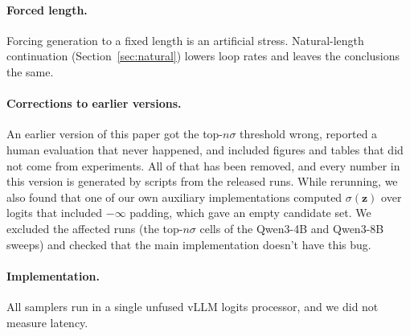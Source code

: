 \documentclass{article}
\begin{document}
\paragraph{Forced length.}
Forcing generation to a fixed length is an artificial stress. Natural-length continuation (Section~\ref{sec:natural}) lowers loop rates and leaves the conclusions the same.

\paragraph{Corrections to earlier versions.}
An earlier version of this paper got the top-$n\sigma$ threshold wrong, reported a human evaluation that never happened, and included figures and tables that did not come from experiments. All of that has been removed, and every number in this version is generated by scripts from the released runs. While rerunning, we also found that one of our own auxiliary implementations computed $\sigma(\mathbf{z})$ over logits that included $-\infty$ padding, which gave an empty candidate set. We excluded the affected runs (the top-$n\sigma$ cells of the Qwen3-4B and Qwen3-8B sweeps) and checked that the main implementation doesn't have this bug.

\paragraph{Implementation.}
All samplers run in a single unfused vLLM logits processor, and we did not measure latency.


\end{document}
